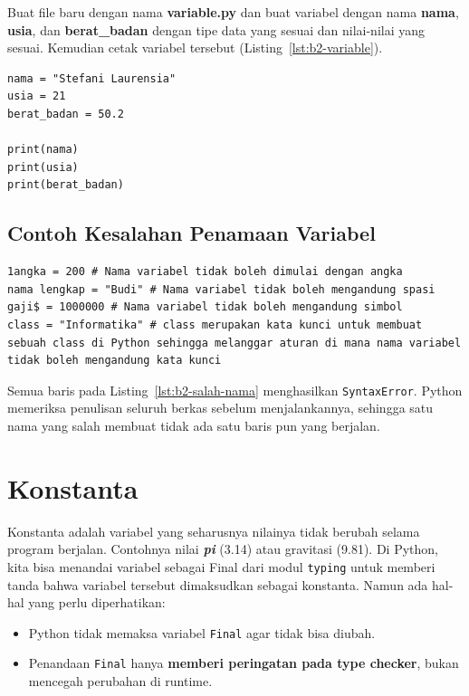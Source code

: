 Buat file baru dengan nama \textbf{variable.py} dan buat variabel dengan nama \textbf{nama}, \textbf{usia}, dan \textbf{berat_badan} dengan tipe data yang sesuai dan nilai-nilai yang sesuai. Kemudian cetak variabel tersebut (Listing~\ref{lst:b2-variable}).

\begin{lstlisting}[style=PythonStyle, caption={Kode Python: variable.py}, label={lst:b2-variable}]
nama = "Stefani Laurensia"
usia = 21
berat_badan = 50.2

print(nama)
print(usia)
print(berat_badan)
\end{lstlisting}

\subsection{Contoh Kesalahan Penamaan Variabel}

\begin{lstlisting}[style=PythonStyle, caption={Contoh penamaan variabel yang salah}, label={lst:b2-salah-nama}]
1angka = 200 # Nama variabel tidak boleh dimulai dengan angka
nama lengkap = "Budi" # Nama variabel tidak boleh mengandung spasi
gaji$ = 1000000 # Nama variabel tidak boleh mengandung simbol
class = "Informatika" # class merupakan kata kunci untuk membuat sebuah class di Python sehingga melanggar aturan di mana nama variabel tidak boleh mengandung kata kunci
\end{lstlisting}

Semua baris pada Listing~\ref{lst:b2-salah-nama} menghasilkan \texttt{SyntaxError}. Python memeriksa penulisan seluruh berkas sebelum menjalankannya, sehingga satu nama yang salah membuat tidak ada satu baris pun yang berjalan.

\section{Konstanta}

Konstanta adalah variabel yang seharusnya nilainya tidak berubah selama program berjalan. Contohnya nilai \textbf{\textit{pi}} (3.14) atau gravitasi (9.81). Di Python, kita bisa menandai variabel sebagai Final dari modul \texttt{typing} untuk memberi tanda bahwa variabel tersebut dimaksudkan sebagai konstanta. Namun ada hal-hal yang perlu diperhatikan:
\begin{itemize}
	\item Python tidak memaksa variabel \texttt{Final} agar tidak bisa diubah.
	\item Penandaan \texttt{Final} hanya \textbf{memberi peringatan pada type checker}, bukan mencegah perubahan di runtime.
\end{itemize}

